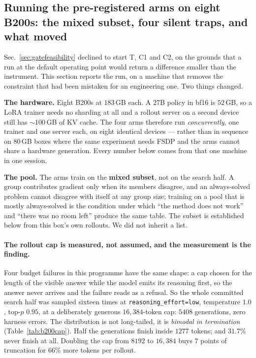\subsection{Running the pre-registered arms on eight B200s: the mixed subset, four silent
traps, and what moved}
\label{sec:gatearms}

Sec.~\ref{sec:gatefeasibility} declined to start T, C1 and C2, on the grounds that a run at
the default operating point would return a difference smaller than the instrument. This
section reports the run, on a machine that removes the constraint that had been mistaken for
an engineering one. Two things changed.

\textbf{The hardware.} Eight B200s at $183$\,GB each. A $27$B policy in bf16 is $52$\,GB, so a
LoRA trainer needs no sharding at all and a rollout server on a second device still has
$\sim\!100$\,GB of KV cache. The four arms therefore run \emph{concurrently}, one trainer and
one server each, on eight identical devices --- rather than in sequence on $80$\,GB boxes
where the same experiment needs FSDP and the arms cannot share a hardware generation. Every
number below comes from that one machine in one session.

\textbf{The pool.} The arms train on the \textbf{mixed subset}, not on the search half. A
group contributes gradient only when its members disagree, and an always-solved problem cannot
disagree with itself at any group size; training on a pool that is mostly always-solved is the
condition under which ``the method does not work'' and ``there was no room left'' produce the
same table. The subset is established below from this box's own rollouts. We did not inherit a
list.

\paragraph{The rollout cap is measured, not assumed, and the measurement is the finding.}
Four budget failures in this programme have the same shape: a cap chosen for the length of the
visible answer while the model emits its reasoning first, so the answer never arrives and the
failure reads as a refusal. So the whole committed search half was sampled sixteen times at
\texttt{reasoning\_effort=low}, temperature $1.0$, top-$p$ $0.95$, at a deliberately generous
$16{,}384$-token cap: $5408$ generations, zero harness errors.
The distribution is not long-tailed, it is \emph{bimodal in termination}
(Table~\ref{tab:b200cap}). Half the generations finish inside $1277$ tokens; and $31.7\%$ never
finish at all. Doubling the cap from $8192$ to $16{,}384$ buys $7$ points of truncation for
$66\%$ more tokens per rollout.

